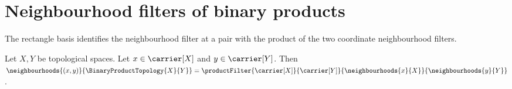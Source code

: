 \section{Neighbourhood filters of binary products}




The rectangle basis identifies the neighbourhood filter at a pair with the
product of the two coordinate neighbourhood filters.

\begin{theorem}\label{neighbourhood_filter_of_product}
    Let $X,Y$ be topological spaces.
    Let $x\in\carrier[X]$ and $y\in\carrier[Y]$.
    Then
        $\neighbourhoods{(x,y)}{\BinaryProductTopology{X}{Y}}
        =\productFilter{\carrier[X]}{\carrier[Y]}{
            \neighbourhoods{x}{X}}{\neighbourhoods{y}{Y}}$.
\end{theorem}
